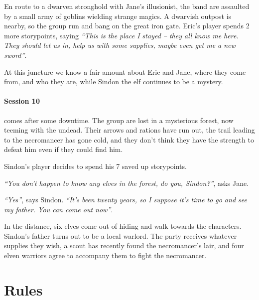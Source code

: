 \begin{multicols}{2}
{En route to a dwarven stronghold with Jane's illusionist, the band are assaulted by a small army of goblins wielding strange magics.
A dwarvish outpost is nearby, so the group run and bang on the great iron gate.  Eric's player spends 2 more \glspl{storypoint}, saying \textit{``This is the place I stayed -- they all know me here.
They should let us in, help us with some supplies, maybe even get me a new sword''}.

At this juncture we know a fair amount about Eric and Jane, where they come from, and who they are, while Sindon the elf continues to be a mystery.

\paragraph{Session 10} comes after some downtime.  The group are lost in a mysterious forest, now teeming with the undead.  Their arrows and rations have run out, the trail leading to the necromancer has gone cold, and they don't think they have the strength to defeat him even if they could find him.

Sindon's player decides to spend his 7 saved up \glspl{storypoint}.

\textit{``You don't happen to know any elves in the forest, do you, Sindon?''}, asks Jane.

\textit{``Yes''}, says Sindon.  \textit{``It's been twenty years, so I suppose it's time to go and see my father.  You can come out now''}.

In the distance, six elves come out of hiding and walk towards the characters.
Sindon's father turns out to be a local warlord.
The party receives whatever supplies they wish, a scout has recently found the necromancer's lair, and four elven warriors agree to accompany them to fight the necromancer.

}{}
\end{multicols}

\section{ Rules}

